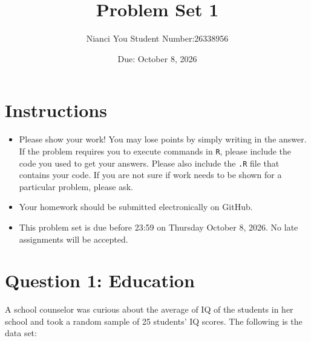 \documentclass[12pt,letterpaper]{article}
\title{Problem Set 1}
\date{Due: October 8, 2026}
\author{Nianci You Student Number:26338956}
\begin{document}
	\maketitle
	
	\section*{Instructions}
	\begin{itemize}
	\item Please show your work! You may lose points by simply writing in the answer. If the problem requires you to execute commands in \texttt{R}, please include the code you used to get your answers. Please also include the \texttt{.R} file that contains your code. If you are not sure if work needs to be shown for a particular problem, please ask.
\item Your homework should be submitted electronically on GitHub.
\item This problem set is due before 23:59 on Thursday October 8, 2026. No late assignments will be accepted.
	\end{itemize}
	
	\vspace{1cm}
	\section*{Question 1: Education}

A school counselor was curious about the average of IQ of the students in her school and took a random sample of 25 students' IQ scores. The following is the data set:\\
\vspace{.5cm}

  


\vspace{1cm}
\end{document}
